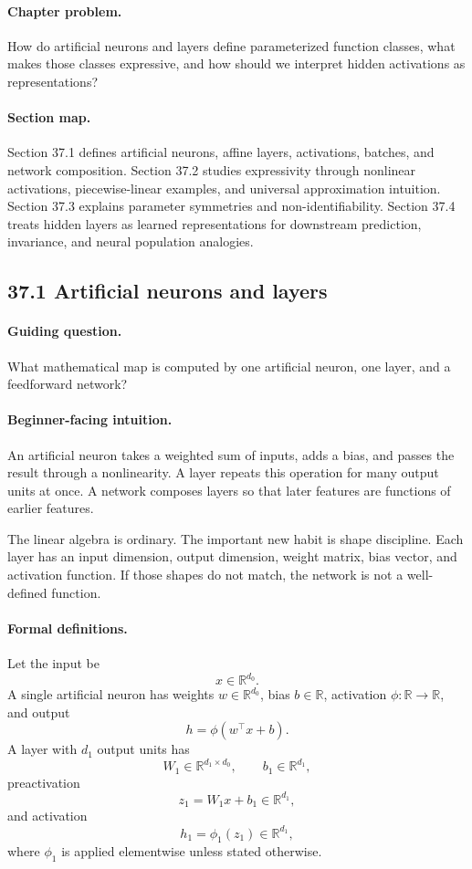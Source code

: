 \paragraph{Chapter problem.}
How do artificial neurons and layers define parameterized function classes, what makes those classes expressive, and how should we interpret hidden activations as representations?

\paragraph{Section map.}
Section 37.1 defines artificial neurons, affine layers, activations, batches, and network composition. Section 37.2 studies expressivity through nonlinear activations, piecewise-linear examples, and universal approximation intuition. Section 37.3 explains parameter symmetries and non-identifiability. Section 37.4 treats hidden layers as learned representations for downstream prediction, invariance, and neural population analogies.

\subsection{37.1 Artificial neurons and layers}

\paragraph{Guiding question.}
What mathematical map is computed by one artificial neuron, one layer, and a feedforward network?

\paragraph{Beginner-facing intuition.}
An artificial neuron takes a weighted sum of inputs, adds a bias, and passes the result through a nonlinearity. A layer repeats this operation for many output units at once. A network composes layers so that later features are functions of earlier features.

The linear algebra is ordinary. The important new habit is shape discipline. Each layer has an input dimension, output dimension, weight matrix, bias vector, and activation function. If those shapes do not match, the network is not a well-defined function.

\paragraph{Formal definitions.}
Let the input be
\[
x\in\mathbb R^{d_0}.
\]
A single artificial neuron has weights \(w\in\mathbb R^{d_0}\), bias \(b\in\mathbb R\), activation \(\phi:\mathbb R\to\mathbb R\), and output
\[
\boxed{
h=\phi(w^\top x+b).
}
\]
A layer with \(d_1\) output units has
\[
W_1\in\mathbb R^{d_1\times d_0},\qquad b_1\in\mathbb R^{d_1},
\]
preactivation
\[
z_1=W_1x+b_1\in\mathbb R^{d_1},
\]
and activation
\[
h_1=\phi_1(z_1)\in\mathbb R^{d_1},
\]
where \(\phi_1\) is applied elementwise unless stated otherwise.

